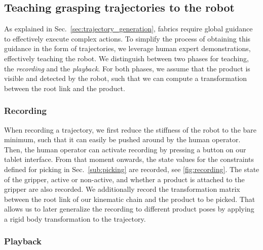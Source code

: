 \subsection{Teaching grasping trajectories to the robot}
\label{sub:teaching}

As explained in Sec.~\ref{sec:trajectory_generation}, \ac{fabrics} require global guidance to effectively execute complex actions.
To simplify the process of obtaining this guidance in the form of trajectories, we leverage human expert demonstrations, effectively teaching the robot.
We distinguish between two
phases for teaching, the \textit{recording} and the
\textit{playback}. For both phases, we assume that the product
is visible and detected by the robot, such that we can
compute a transformation between the root link and the product.

\subsubsection{Recording}
When recording a trajectory, we first reduce the stiffness
of the robot to the bare minimum, such that it can easily be
pushed around by the human operator. Then, the human
operator can activate recording by pressing a button on our tablet interface. From that moment onwards, the state values \x{} for the
constraints defined for picking in Sec.~\cref{sub:picking}
are recorded, see \cref{fig:recording}.
The state of the gripper, active
or non-active, and whether a product is attached to the gripper
are also recorded.
We additionally record the
transformation matrix between the root link of our kinematic
chain and the product to be picked. That allows us to later
generalize the recording to different product poses by applying a rigid body transformation to the trajectory.


\subsubsection{Playback}

